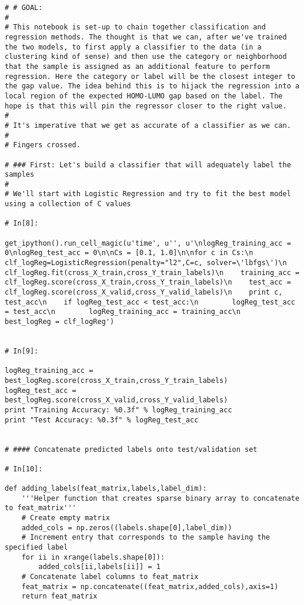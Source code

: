 \documentclass[11pt, oneside]{article}   	%
\begin{document}
\begin{lstlisting}
# # GOAL:
# 
# This notebook is set-up to chain together classification and regression methods. The thought is that we can, after we've trained the two models, to first apply a classifier to the data (in a clustering kind of sense) and then use the category or neighborhood that the sample is assigned as an additional feature to perform regression. Here the category or label will be the closest integer to the gap value. The idea behind this is to hijack the regression into a local region of the expected HOMO-LUMO gap based on the label. The hope is that this will pin the regressor closer to the right value. 
# 
# It's imperative that we get as accurate of a classifier as we can.
# 
# Fingers crossed.

# ### First: Let's build a classifier that will adequately label the samples
# 
# We'll start with Logistic Regression and try to fit the best model using a collection of C values

# In[8]:

get_ipython().run_cell_magic(u'time', u'', u'\nlogReg_training_acc = 0\nlogReg_test_acc = 0\n\nCs = [0.1, 1.0]\n\nfor c in Cs:\n    clf_logReg=LogisticRegression(penalty="l2",C=c, solver=\'lbfgs\')\n    clf_logReg.fit(cross_X_train,cross_Y_train_labels)\n    training_acc = clf_logReg.score(cross_X_train,cross_Y_train_labels)\n    test_acc = clf_logReg.score(cross_X_valid,cross_Y_valid_labels)\n    print c, test_acc\n    if logReg_test_acc < test_acc:\n        logReg_test_acc = test_acc\n        logReg_training_acc = training_acc\n        best_logReg = clf_logReg')


# In[9]:

logReg_training_acc = best_logReg.score(cross_X_train,cross_Y_train_labels)
logReg_test_acc = best_logReg.score(cross_X_valid,cross_Y_valid_labels)
print "Training Accuracy: %0.3f" % logReg_training_acc
print "Test Accuracy: %0.3f" % logReg_test_acc


# #### Concatenate predicted labels onto test/validation set

# In[10]:

def adding_labels(feat_matrix,labels,label_dim):
    '''Helper function that creates sparse binary array to concatenate to feat_matrix'''
    # Create empty matrix 
    added_cols = np.zeros((labels.shape[0],label_dim))
    # Increment entry that corresponds to the sample having the specified label
    for ii in xrange(labels.shape[0]):
        added_cols[ii,labels[ii]] = 1
    # Concatenate label columns to feat_matrix
    feat_matrix = np.concatenate((feat_matrix,added_cols),axis=1)
    return feat_matrix



\end{lstlisting}
\end{document}
